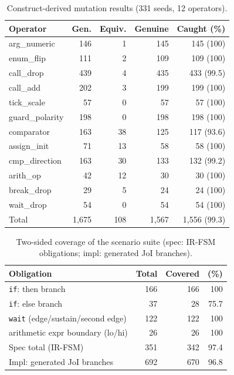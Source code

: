 \documentclass[sigconf,nonacm,anonymous,review]{acmart}
\begin{document}
\begin{table}[t]
\centering
\caption{Construct-derived mutation results (331 seeds, 12 operators).}
\label{tab:mutation}
\small
\setlength{\tabcolsep}{4.5pt}
\begin{tabular}{lrrrr}
\toprule
Operator & Gen. & Equiv. & Genuine & Caught (\%) \\
\midrule
arg\_numeric    & 146 & 1  & 145 & 145 (100) \\
enum\_flip      & 111 & 2  & 109 & 109 (100) \\
call\_drop      & 439 & 4  & 435 & 433 (99.5) \\
call\_add       & 202 & 3  & 199 & 199 (100) \\
tick\_scale     & 57  & 0  & 57  & 57 (100) \\
guard\_polarity & 198 & 0  & 198 & 198 (100) \\
comparator      & 163 & 38 & 125 & 117 (93.6) \\
assign\_init    & 71  & 13 & 58  & 58 (100) \\
cmp\_direction  & 163 & 30 & 133 & 132 (99.2) \\
arith\_op       & 42  & 12 & 30  & 30 (100) \\
break\_drop     & 29  & 5  & 24  & 24 (100) \\
wait\_drop      & 54  & 0  & 54  & 54 (100) \\
\midrule
Total           & 1,675 & 108 & 1,567 & 1,556 (99.3) \\
\bottomrule
\end{tabular}
\end{table}

\begin{table}[t]
\centering
\caption{Two-sided coverage of the scenario suite (spec: IR-FSM obligations; impl: generated JoI branches).}
\label{tab:coverage}
\small
\begin{tabular}{lrrr}
\toprule
Obligation & Total & Covered & (\%) \\
\midrule
\texttt{if}: then branch            & 166 & 166 & 100 \\
\texttt{if}: else branch            & 37  & 28  & 75.7 \\
\texttt{wait} (edge/sustain/second edge) & 122 & 122 & 100 \\
arithmetic expr boundary (lo/hi)    & 26  & 26  & 100 \\
\midrule
Spec total (IR-FSM)                 & 351 & 342 & 97.4 \\
Impl: generated JoI branches        & 692 & 670 & 96.8 \\
\bottomrule
\end{tabular}
\end{table}
\end{document}
